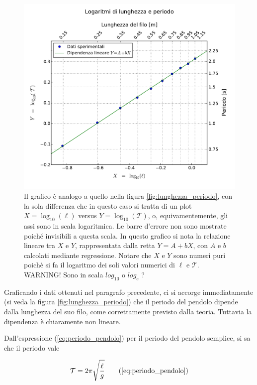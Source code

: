 \begin{figure}
    \centering
    \includegraphics[width=120mm]{immagini/log.pdf}
    \caption{Il grafico è analogo a quello nella figura \ref{fig:lunghezza_periodo}, con la sola differenza
        che in questo caso si tratta di un plot $X = \log_{10} (\ell)$ versus $Y = \log_{10} (\mathcal{T})$, o, equivamentemente,
        gli assi sono in scala logaritmica. Le barre d'errore non sono mostrate poiché invisibili a questa scala.
        In questo grafico si nota la relazione lineare tra $X$ e $Y$, rappresentata dalla retta $Y = A + bX$, con $A$ e $b$ calcolati
    mediante regressione. Notare che $X$ e $Y$ sono numeri puri poichè si fa il logaritmo dei soli valori numerici di $\ell$ e $\mathcal{T}$.
    WARNING! Sono in scala $log_{10}$ o $log_{e}$ ?}
    \label{fig:lunghezza_periodo_log}
\end{figure}

\label{l_pred_teo}

Graficando i dati ottenuti nel paragrafo precedente, ci si accorge immediatamente (si veda
la figura \ref{fig:lunghezza_periodo}) che il periodo del pendolo dipende dalla lunghezza
del suo filo, come correttamente previsto dalla teoria. Tuttavia la dipendenza è chiaramente non lineare.

Dall'espressione (\ref{eq:periodo_pendolo}) per il periodo del pendolo semplice, si sa che
il periodo vale

\begin{equation}
    \mathcal{T} = 2\pi\sqrt{\frac{\ell}{g}}
    \tag{\ref{eq:periodo_pendolo}}
\end{equation}

